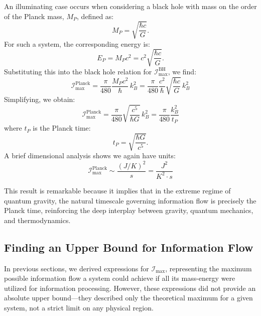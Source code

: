 \documentclass[12pt]{article}
\begin{document}
An illuminating case occurs when considering a black hole with mass on the order of the Planck mass, \( M_P \), defined as:
\begin{equation}
    M_P = \sqrt{\frac{\hbar c}{G}}.
\end{equation}
For such a system, the corresponding energy is:
\begin{equation}
    E_P = M_P c^2 = c^2 \sqrt{\frac{\hbar c}{G}}.
\end{equation}
Substituting this into the black hole relation for \(\mathcal{I}_{\text{max}}^{\text{BH}}\), we find:
\begin{equation}
    \mathcal{I}_{\text{max}}^{\text{Planck}} = \frac{\pi}{480} \frac{M_P c^2}{\hbar} \, k_B^2
    = \frac{\pi}{480} \frac{c^2}{\hbar} \sqrt{\frac{\hbar c}{G}} \, k_B^2
\end{equation}
Simplifying, we obtain:
\begin{equation}
    \mathcal{I}_{\text{max}}^{\text{Planck}} = \frac{\pi}{480} \sqrt{\frac{c^5}{\hbar G}} \, k_B^2
    = \frac{\pi}{480} \frac{k_B^2}{t_P}
\end{equation}
where \( t_P \) is the Planck time:
\begin{equation}
    t_P = \sqrt{\frac{\hbar G}{c^5}}.
\end{equation}
A brief dimensional analysis shows we again have units:
\begin{equation}
    \mathcal{I}_{\text{max}}^{\text{Planck}} \sim \frac{(J/K)^2}{s}
    = \frac{J^2}{K^2 \cdot s}
\end{equation}

This result is remarkable because it implies that in the extreme regime of quantum gravity, the natural timescale governing information flow is precisely the Planck time, reinforcing the deep interplay between gravity, quantum mechanics, and thermodynamics.


\subsection{Finding an Upper Bound for Information Flow}

In previous sections, we derived expressions for \( \mathcal{I}_{\max} \), representing the maximum possible information flow a system could achieve if all its mass-energy were utilized for information processing. However, these expressions did not provide an absolute upper bound—they described only the theoretical maximum for a given system, not a strict limit on any physical region.
\end{document}

